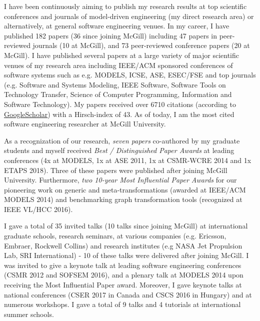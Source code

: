 I have been continuously aiming to publish my research results at top scientific conferences and journals of model-driven engineering (my direct research area) or alternatively, at general software engineering venues. In my career, I have published 182 papers (36 since joining McGill) including 47 papers in peer-reviewed journals (10 at McGill), and 73 peer-reviewed conference papers (20 at McGill). I have published several papers at a large variety of major scientific venues of my research area including IEEE/ACM sponsored conferences of software systems such as e.g. MODELS, ICSE, ASE, ESEC/FSE and top journals (e.g. Software and Systems Modeling, IEEE Software, Software Tools on Technology Transfer, Science of Computer Programming, Information and Software Technology). My papers received over 6710 citations (according to \href{https://scholar.google.ca/citations?user=4Ya6dVoAAAAJ&hl=en}{GoogleScholar}) with a Hirsch-index of 43. As of today, I am the most cited software engineering researcher at McGill University.  

As a recognization of our research, \emph{seven papers} co-authored by my graduate students and myself received \emph{Best / Distinguished Paper Awards} at leading conferences (4x at MODELS, 1x at ASE 2011, 1x at CSMR-WCRE 2014 and 1x ETAPS 2018). Three of these papers were published after joining McGill University. Furthermore, \emph{two 10-year Most Influential Paper Awards} for our pioneering work on generic and meta-transformations (awarded at IEEE/ACM MODELS 2014) and benchmarking graph transformation tools (recognized at IEEE VL/HCC 2016).

I gave a total of 35 invited talks (10 talks since joining McGill) at international graduate schools, research seminars, at various companies (e.g. Ericsson, Embraer, Rockwell Collins) and research institutes (e.g NASA Jet Propulsion Lab, SRI International) - 10 of these talks were delivered after joining McGill. I was invited to give a keynote talk at leading software engineering conferences (CSMR 2012 and SOFSEM 2016), and a plenary talk at MODELS 2014 upon receiving the Most Influential Paper award. Moreover, I gave keynote talks at national conferences (CSER 2017 in Canada and CSCS 2016 in Hungary) and at numerous workshops. I gave a total of 9 talks and 4 tutorials at international summer schools.%

